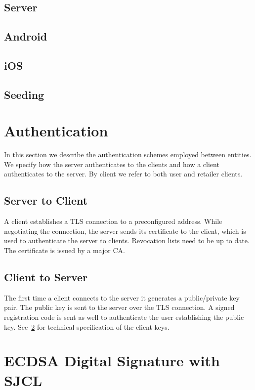 \documentclass[a4paper,10pt]{article}
\begin{document}
\subsection{Server}

\subsection{Android}

\subsection{iOS}

\subsection{Seeding}

\section{Authentication}
In this section we describe the authentication schemes employed between entities. We specify how the server authenticates to the clients and how a client authenticates to the 
server. By client we refer to both user and retailer clients. 

\subsection{Server to Client}
A client establishes a TLS connection to a preconfigured address. While negotiating the connection, the server sends its certificate to the client, which is used to authenticate 
the server to clients. Revocation lists need to be up to date. The certificate is issued by a major CA.

\subsection{Client to Server}
The first time a client connects to the server it generates a public/private key pair. The public key is sent to the server over the TLS connection. A signed registration code is 
sent as well to authenticate the user establishing the public key. See~\ref{sec:digital_signature} for technical specification of the client keys.

\section{ECDSA Digital Signature with SJCL}
\label{sec:digital_signature}
\end{document}

